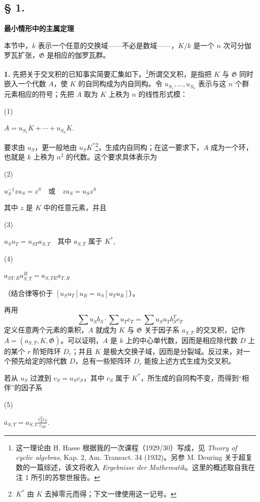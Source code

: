 \documentclass[11pt]{article}
\providecommand{\srcnumdisplay}[3][3.4em]{%
  \par\smallskip\noindent
  \begin{minipage}[t]{#1}\vspace*{0pt}#2\end{minipage}%
  \begin{minipage}[t]{\dimexpr\linewidth-#1\relax}\vspace*{0pt}\centering
  \(\displaystyle #3\)
  \end{minipage}\par\smallskip}
\begin{document}
\subsection*{§ 1.}
\begin{center}
\textbf{最小情形中的主属定理}
\end{center}

本节中，\(k\) 表示一个任意的交换域——不必是数域——，\(K/k\) 是一个 \(n\) 次可分伽罗瓦扩张，\(\mathfrak G\) 是相应的伽罗瓦群。

\noindent\textbf{1.} 先把关于交叉积的已知事实简要汇集如下。\footnote{这一理论由 H. Hasse 根据我的一次课程（1929/30）写成，见 \emph{Theory of cyclic algebras}, Kap. 2, Am. Transact. 34 (1932)。另参 M. Deuring 关于超复数的一篇综述，该文将收入 \emph{Ergebnisse der Mathematik}。这里的概述取自我在注 1 所引的苏黎世报告。}所谓交叉积，是指把 \(K\) 与 \(\mathfrak G\) 同时嵌入一个代数 \(A\)，使 \(K\) 的自同构成为内自同构。令 \(u_{S_1},\ldots,u_{S_n}\) 表示与这 \(n\) 个群元素相应的符号；先把 \(A\) 取为 \(K\) 上秩为 \(n\) 的线性形式模：

\srcnumdisplay{(1)}{A=u_{S_1}K+\cdots+u_{S_n}K.}

要求由 \(u_S\)，更一般地由 \(u_SK^*\)\footnote{\(K^*\) 由 \(K\) 去掉零元而得；下文一律使用这一记号。}，生成内自同构；在这一要求下，\(A\) 成为一个环，也就是 \(k\) 上秩为 \(n^2\) 的代数。这个要求具体表示为

\srcnumdisplay{(2)}{u_S^{-1}zu_S=z^S\quad\text{或}\quad zu_S=u_Sz^S}

其中 \(z\) 是 \(K\) 中的任意元素，并且

\srcnumdisplay{(3)}{u_Su_T=u_{ST}a_{S,T}\quad\text{其中 }a_{S,T}\text{ 属于 }K^*,}

\srcnumdisplay{(4)}{a_{ST,R}a_{S,T}^{R}=a_{S,TR}a_{T,R}}

（结合律等价于 \([u_Su_T]u_R=u_S[u_Tu_R]\)）。

再用
\[
\sum u_Sb_S\cdot\sum u_Tc_T=\sum u_Su_Tb_S^Tc_T
\]
定义任意两个元素的乘积，\(A\) 就成为 \(K\) 与 \(\mathfrak G\) 关于因子系 \(a_{S,T}\) 的交叉积，记作 \(A=(a_{S,T},K,\mathfrak G)\)。可以证明，\(A\) 是 \(k\) 上的中心单代数，因而是相应除代数 \(D\) 上的某个 \(r\) 阶矩阵环 \(D_r\)；并且 \(K\) 是极大交换子域，因而是分裂域。反过来，对一个预先给定的除代数 \(D\)，总有一些矩阵环 \(D_r\) 能按上述方式生成为交叉积。

若从 \(u_S\) 过渡到 \(v_S=u_Sc_S\)，其中 \(c_S\) 属于 \(K^*\)，所生成的自同构不变，而得到“相伴”的因子系

\srcnumdisplay{(5)}{\bar a_{S,T}=a_{S,T}\frac{c_S^Tc_T}{c_{ST}}.}
\end{document}
